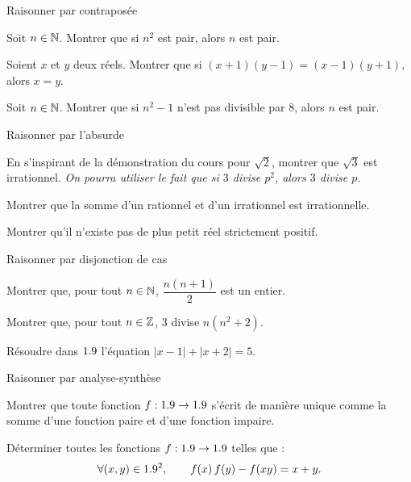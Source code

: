 
\begin{exercice}[2]{Raisonner par contraposée}
\begin{questions}
  \item Soit $n\in\mathbb{N}$. Montrer que si $n^{2}$ est pair, alors $n$ est pair.
  \item Soient $x$ et $y$ deux réels. Montrer que si
    $(x+1)(y-1)=(x-1)(y+1)$, alors $x=y$.
  \item Soit $n\in\mathbb{N}$. Montrer que si $n^{2}-1$ n'est pas divisible par $8$,
    alors $n$ est pair.
\end{questions}
\end{exercice}

\begin{exercice}[2]{Raisonner par l'absurde}
\begin{questions}
  \item En s'inspirant de la démonstration du cours pour $\sqrt{2}$,
    montrer que $\sqrt{3}$ est irrationnel. \emph{On pourra utiliser le fait
    que si $3$ divise $p^{2}$, alors $3$ divise $p$.}
  \item Montrer que la somme d'un rationnel et d'un irrationnel est
    irrationnelle.
  \item Montrer qu'il n'existe pas de plus petit réel strictement positif.
\end{questions}
\end{exercice}

\begin{exercice}[2]{Raisonner par disjonction de cas}
\begin{questions}
  \item Montrer que, pour tout $n\in\mathbb{N}$, $\dfrac{n(n+1)}{2}$ est un entier.
  \item Montrer que, pour tout $n\in\mathbb{Z}$, $3$ divise $n(n^{2}+2)$.
  \item Résoudre dans $1.9$ l'équation $|x-1|+|x+2|=5$.
\end{questions}
\end{exercice}

\begin{exercice}[2]{Raisonner par analyse-synthèse}
\begin{questions}
  \item Montrer que toute fonction $f:1.9\to1.9$ s'écrit de manière unique
    comme la somme d'une fonction paire et d'une fonction impaire.
  \item Déterminer toutes les fonctions $f:1.9\to1.9$ telles que :
    \[ \forall(x,y)\in1.9^{2},\qquad f(x)\,f(y)-f(xy)=x+y. \]
\end{questions}
\end{exercice}

